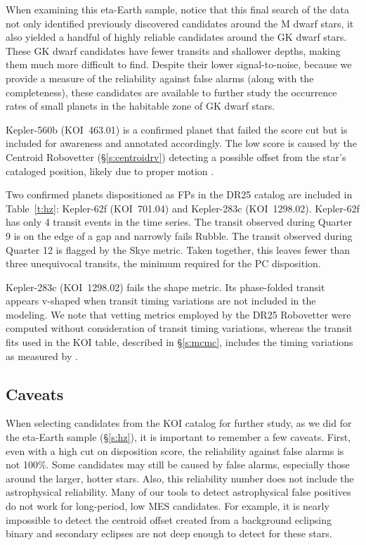 When examining this eta-Earth sample, notice that this final search of the \Kepler{} data not only identified previously discovered candidates around the M dwarf stars, it also yielded a handful of highly reliable candidates around the GK dwarf stars. These GK dwarf candidates have fewer transits and shallower depths, making them much more difficult to find.  Despite their lower signal-to-noise, because we provide a measure of the reliability against false alarms (along with the completeness), these candidates are available to further study the occurrence rates of small planets in the habitable zone of GK dwarf stars.

Kepler-560b (KOI~463.01) is a confirmed planet that failed the score cut but is included for awareness and annotated accordingly.  The low score is caused by the Centroid Robovetter (\S\ref{s:centroidrv}) detecting a possible offset from the star's cataloged position, likely due to proper motion \citep{Mann2017}.  

Two confirmed planets dispositioned as FPs in the DR25 catalog are included in Table~\ref{t:hz}: Kepler-62f (KOI~701.04) and Kepler-283c (KOI~1298.02).  Kepler-62f has only 4 transit events in the time series.  The transit observed during Quarter 9 is on the edge of a gap and narrowly fails Rubble.  The transit observed during Quarter 12 is flagged by the Skye metric.  Taken together, this leaves fewer than three unequivocal transits, the minimum required for the PC disposition. 

Kepler-283c (KOI~1298.02) fails the shape metric.  Its phase-folded transit appears v-shaped when transit timing variations are not included in the modeling.  We note that vetting metrics employed by the DR25 Robovetter were computed without consideration of transit timing variations, whereas the transit fits used in the KOI table, described in \S\ref{s:mcmc}, includes the timing variations as measured by \citet{Rowe2015cat}. 



\subsection{Caveats}
When selecting candidates from the KOI catalog for further study, as we did for the eta-Earth sample (\S\ref{s:hz}), it is important to remember a few caveats. First, even with a high cut on disposition score, the reliability against false alarms is not 100\%. Some candidates may still be caused by false alarms, especially those around the larger, hotter stars. Also, this reliability number does not include the astrophysical reliability. Many of our tools to detect astrophysical false positives do not work for long-period, low MES candidates. For example, it is nearly impossible to detect the centroid offset created from a background eclipsing binary and secondary eclipses are not deep enough to detect for these stars. 

